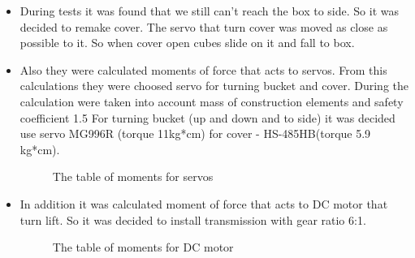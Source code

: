 \begin{itemize}
\item During tests it was found that we still can't reach the box to side. So it was decided to remake cover. The servo that turn cover was moved as close as possible to it. So when cover open cubes slide on it and fall to box. 

\item Also they were calculated moments of force that acts to servos. From this calculations they were choosed servo for turning bucket and cover. During the calculation were taken into account mass of construction elements and safety coefficient 1.5 For turning bucket (up and down and to side) it was decided use servo MG996R (torque 11kg*cm) for cover - HS-485HB(torque 5.9 kg*cm).
\begin{figure}[H]
	\begin{minipage}[h]{\linewidth}
		\caption{The table of moments for servos}
	\end{minipage}
\end{figure}
\item In addition it was calculated moment of force that acts to DC motor that turn lift. So it was decided to install transmission with gear ratio 6:1.
\begin{figure}[H]
	\begin{minipage}[h]{\linewidth}
		\caption{The table of moments for DC motor}
	\end{minipage}
\end{figure}
\end{itemize}
\fillpage

